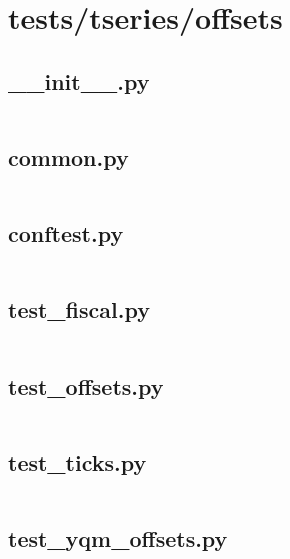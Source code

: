 \documentclass{article}
\begin{document}
\section{tests/tseries/offsets}

\subsection{\_\_init\_\_.py}
\inputminted{python}{/home/dufferzafar/dev/@clones/pandas/pandas/tests/tseries/offsets/__init__.py}
\newpage

\subsection{common.py}
\inputminted{python}{/home/dufferzafar/dev/@clones/pandas/pandas/tests/tseries/offsets/common.py}
\newpage

\subsection{conftest.py}
\inputminted{python}{/home/dufferzafar/dev/@clones/pandas/pandas/tests/tseries/offsets/conftest.py}
\newpage

\subsection{test\_fiscal.py}
\inputminted{python}{/home/dufferzafar/dev/@clones/pandas/pandas/tests/tseries/offsets/test_fiscal.py}
\newpage

\subsection{test\_offsets.py}
\inputminted{python}{/home/dufferzafar/dev/@clones/pandas/pandas/tests/tseries/offsets/test_offsets.py}
\newpage

\subsection{test\_ticks.py}
\inputminted{python}{/home/dufferzafar/dev/@clones/pandas/pandas/tests/tseries/offsets/test_ticks.py}
\newpage

\subsection{test\_yqm\_offsets.py}
\inputminted{python}{/home/dufferzafar/dev/@clones/pandas/pandas/tests/tseries/offsets/test_yqm_offsets.py}
\newpage
\end{document}

